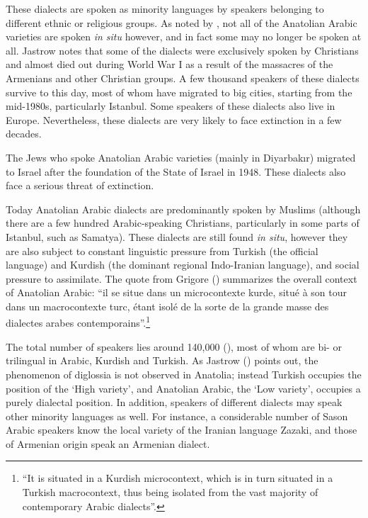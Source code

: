 \documentclass[output=paper]{langsci/langscibook}
\begin{document}
These dialects are spoken as minority languages by speakers belonging to different ethnic or religious groups. As noted by \cite{Jastrow2006}, not all of the Anatolian Arabic varieties are spoken \textit{in situ} however, and in fact some may no longer be spoken at all. Jastrow notes that some of the dialects were exclusively spoken by Christians and almost died out during World War I as a result of the massacres of the Armenians and other Christian groups. A few thousand speakers of these dialects survive to this day, most of whom have migrated to big cities, starting from the mid-1980s, particularly Istanbul. Some speakers of these dialects also live in Europe. Nevertheless, these dialects are very likely to face extinction in a few decades. 

The Jews who spoke Anatolian Arabic varieties (mainly in Diyarbak{\i}r) migrated to Israel after the foundation of the State of Israel in 1948. These dialects also face a serious threat of extinction. 

Today Anatolian Arabic dialects are predominantly spoken by Muslims (although there are a few hundred Arabic-speaking Christians, particularly in some parts of Istanbul, such as Samatya). These dialects are still found \textit{in situ}, however they are also subject to constant linguistic pressure from Turkish (the official language) and Kurdish (the dominant regional Indo-Iranian language), and social pressure to assimilate. The quote from Grigore (\citeyear[27]{Grigore2007book}) summarizes the overall context of Anatolian Arabic: ``il se situe dans un microcontexte kurde, situé à son tour dans un macrocontexte turc, étant isolé de la sorte de la grande masse des dialectes arabes contemporains''.\footnote{``It is situated in a Kurdish microcontext, which is in turn situated in a Turkish macrocontext, thus being isolated from the vast majority of contemporary Arabic dialects''.} 

The total number of speakers lies around 140,000 (\citealt[282]{Versteegh2014book}), most of whom are bi- or trilingual in
Arabic, Kurdish and Turkish. As Jastrow (\citeyear[88]{Jastrow2011anatolian}) points out, the phenomenon of diglossia is not observed in Anatolia; instead Turkish occupies the position of the `High variety', and
Anatolian Arabic, the `Low variety', occupies a purely dialectal position. In addition, speakers of
different dialects may speak other minority languages as well. For instance, a considerable number of Sason Arabic speakers know the local variety of the Iranian language Zazaki, and those of Armenian origin speak an Armenian dialect.
\end{document}
